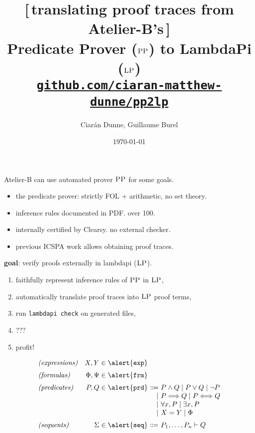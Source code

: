\documentclass[lualatex]{beamer}
\title{
  \small{[\,translating proof traces from Atelier-B's\,]}
\\[1mm]
  \normalsize Predicate Prover ($\pp$) to LambdaPi ($\lp$)
\\[5mm]
  \href{https://github.com/ciaran-matthew-dunne/pp2lp}{
    \texttt{github.com/ciaran-matthew-dunne/pp2lp}
  }
}
\author{Ciarán Dunne, Guillaume Burel}
\institute{Telecom SudParis}
\date{\today}
\newcommand{\lp}{\textsc{LP}}
\newcommand{\pp}{\textsc{PP}}
\begin{document}
\maketitle

\begin{frame}{}
	Atelier-B can use automated prover $\pp$ for some goals.
	\begin{itemize}
		\item the \alert{predicate prover}: strictly FOL + arithmetic, no set theory.
		\item inference rules documented in PDF. over 100.
		\item internally certified by Clearsy. no external checker.
		\item previous ICSPA work allows obtaining \alert{proof traces}.
	\end{itemize}
\end{frame}

\begin{frame}{}
	\textbf{goal}: verify proofs externally in \alert{lambdapi} ($\lp$).
	\begin{enumerate}
		\item faithfully represent inference rules of $\pp$ in $\lp$,
		\item automatically translate proof traces into $\lp$ proof terms,
		\item run \texttt{lambdapi check} on generated files,
		\item ???
		\item profit!

	\end{enumerate}
\end{frame}

\begin{frame}$$
		\begin{array}{l@{\quad}r@{\ }r@{\ }l}
			\textit{(expressions)} & X,Y \in \alert{\texttt{exp}}
			\\[2mm]
			\textit{(formulas)}    & \Phi, \Psi \in \alert{\texttt{frm}}
			\\[2mm]
			\textit{(predicates)}  & P,Q \in \alert{\texttt{prd}}        & \Coloneq &
			P \wedge Q
			\mid P \vee Q
			\mid \neg P
			\\ && \mid &
			P \Longrightarrow Q
			\mid P \Longleftrightarrow Q
			\\ && \mid &
			\forall x, P
			\mid \exists x, P
			\\ && \mid &
			X = Y
			\mid \Phi
			\\[2mm]
			\textit{(sequents)}    & \Sigma \in \alert{\texttt{seq}}     &
			\Coloneq               & P_1, \ldots, P_n \vdash Q
		\end{array}
	$$
\end{frame}
\end{document}
